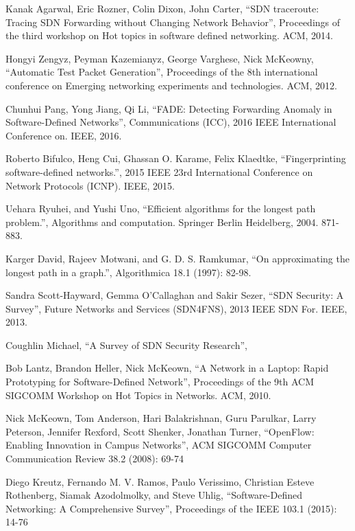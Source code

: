 \begin{thebibliography}{1}

Kanak Agarwal, Eric Rozner, Colin Dixon, John Carter,
``SDN traceroute: Tracing SDN Forwarding without Changing Network Behavior'', Proceedings of the third workshop on Hot topics in software defined networking. ACM, 2014.

Hongyi Zengyz, Peyman Kazemianyz, George Varghese, Nick McKeowny,
``Automatic Test Packet Generation'', Proceedings of the 8th international conference on Emerging networking experiments and technologies. ACM, 2012.

Chunhui Pang, Yong Jiang, Qi Li,
``FADE: Detecting Forwarding Anomaly in Software-Defined Networks'', Communications (ICC), 2016 IEEE International Conference on. IEEE, 2016.


Roberto Bifulco, Heng Cui, Ghassan O. Karame, Felix Klaedtke,
``Fingerprinting software-defined networks.'', 2015 IEEE 23rd International Conference on Network Protocols (ICNP). IEEE, 2015.

Uehara Ryuhei, and Yushi Uno,
``Efficient algorithms for the longest path problem.'', Algorithms and computation. Springer Berlin Heidelberg, 2004. 871-883.

Karger David, Rajeev Motwani, and G. D. S. Ramkumar,
``On approximating the longest path in a graph.'', Algorithmica 18.1 (1997): 82-98.

Sandra Scott-Hayward, Gemma O’Callaghan and Sakir Sezer,
``SDN Security: A Survey'', Future Networks and Services (SDN4FNS), 2013 IEEE SDN For. IEEE, 2013.

Coughlin Michael,
``A Survey of SDN Security Research'',

Bob Lantz, Brandon Heller, Nick McKeown,
``A Network in a Laptop: Rapid Prototyping for Software-Defined Network'', Proceedings of the 9th ACM SIGCOMM Workshop on Hot Topics in Networks. ACM, 2010.

Nick McKeown, Tom Anderson, Hari Balakrishnan, Guru Parulkar, Larry Peterson, Jennifer Rexford, Scott Shenker, Jonathan Turner,
``OpenFlow: Enabling Innovation in Campus Networks'', ACM SIGCOMM Computer Communication Review 38.2 (2008): 69-74

Diego Kreutz, Fernando M. V. Ramos, Paulo Verissimo, Christian Esteve Rothenberg, Siamak Azodolmolky, 
and Steve Uhlig,
``Software-Defined Networking: A Comprehensive Survey'', Proceedings of the IEEE 103.1 (2015): 14-76


\end{thebibliography}
